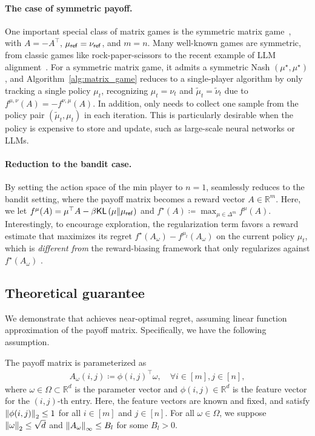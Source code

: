 \paragraph{The case of symmetric payoff.} One important special class of matrix games is the symmetric matrix game~\citep{cheng2004notes}, with $A=-A^\top$, $\mu_{\mathsf{ref}}=\nu_{\mathsf{ref}}$, and $m=n$. Many well-known games are symmetric, from classic games like rock-paper-scissors to the recent example of LLM alignment~\citep{munos2023nash,swamy2024minimaximalist,yang2024faster}. For a symmetric matrix game, it admits a symmetric Nash $(\mu^\star,\mu^\star)$, and Algorithm~\ref{alg:matrix_game}  reduces to a single-player algorithm by only tracking a single policy $\mu_t$, recognizing $\mu_t=\nu_t$ and $\widetilde{\mu}_t= \widetilde{\nu}_t$ due to $f^{\mu,\nu}(A)=-f^{\nu,\mu}(A)$. In addition,  \name only needs to collect one sample from the policy pair $(\widetilde{\mu}_t,\mu_t)$ in each iteration. This is particularly desirable when the policy is expensive to store and update, such as large-scale neural networks or LLMs. 

\paragraph{Reduction to the bandit case.} By setting the action space of the min player to $n=1$, \name seamlessly reduces to the bandit setting, where the payoff matrix becomes a reward vector $A \in \mathbb{R}^m$. Here, we let $f^{\mu}(A) = \mu^{\top} A - \beta\mathsf{KL}\left(\mu\|\mu_{\mathsf{ref}}\right)$ and 
     $f^{\star}(A)\coloneqq \max_{\mu\in\Delta^m} f^{\mu}(A)$. Interestingly, to encourage exploration, the regularization term favors a reward estimate that maximizes its regret $  f^{\star}(A_{\omega}) -  f^{\mu_t}(A_{\omega})$ on the current policy $\mu_t$, which is {\em different from} the reward-biasing framework that only regularizes against $  f^{\star}(A_{\omega})$ \citep{cen2024value,liu2020exploration}.   

\subsection{Theoretical guarantee}\label{sec:matrix_analysis}

We demonstrate that \name achieves near-optimal regret, assuming linear function approximation of the payoff matrix. Specifically, we have the following assumption.

\begin{asmp}\label{asmp:bounded_payoff}
The payoff matrix is parameterized as  
\begin{align}\label{eq:A_param}
    A_\omega(i,j)\coloneqq \phi(i,j)^\top \omega, \quad\forall i\in[m], j\in[n],
\end{align}
where $\omega\in\Omega\subset\mathbb{R}^d$ is the parameter vector and $\phi(i,j)\in\mathbb{R}^d$ is the feature vector for the $(i,j)$-th entry. Here, the feature vectors are known and fixed, and satisfy $\left\| \phi(i,j) \right\|_2\leq 1$ for all $i\in[m]$ and $j\in[n]$. For all $ \omega\in\Omega$, we suppose $\left\| \omega \right\|_2\leq \sqrt{d}$ and $\left\| A_\omega \right\|_{\infty}\leq B_l$ for some $B_l>0$. 
\end{asmp}

